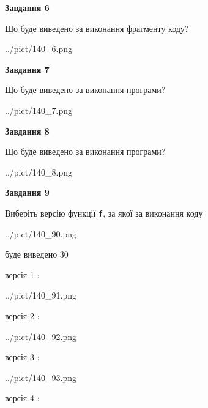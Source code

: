 \documentclass[12pt, ukrainian]{article}
\def\code#1{\Verb!#1!}
\begin{document}
{\begin {large}
{\begin {center}\textbf{Завдання 6}\end {center}}

Що буде виведено за виконання фрагменту коду?\par
\begin{center}
	{../pict/140_6.png}
\end{center}
\newpage

{\begin {center}\textbf{Завдання 7}\end {center}}

Що буде виведено за виконання програми?\par
\begin{center}
	{../pict/140_7.png}
\end{center}
\newpage

{\begin {center}\textbf{Завдання 8}\end {center}}

Що буде виведено за виконання програми?\par
\begin{center}
	{../pict/140_8.png}
\end{center}
\newpage

{\begin {center}\textbf{Завдання 9}\end {center}}

Виберіть версію функції \code{f}, за якої за виконання коду
\begin{center}
	{../pict/140_90.png}
\end{center}
буде виведено 30

\vspace{5mm}
версія 1 :

\begin{center}
	{../pict/140_91.png}
\end{center}
версія 2 :

\begin{center}
	{../pict/140_92.png}
\end{center}
версія 3 :

\begin{center}
	{../pict/140_93.png}
\end{center}
версія 4 :


\end{large}}
\end{document}
